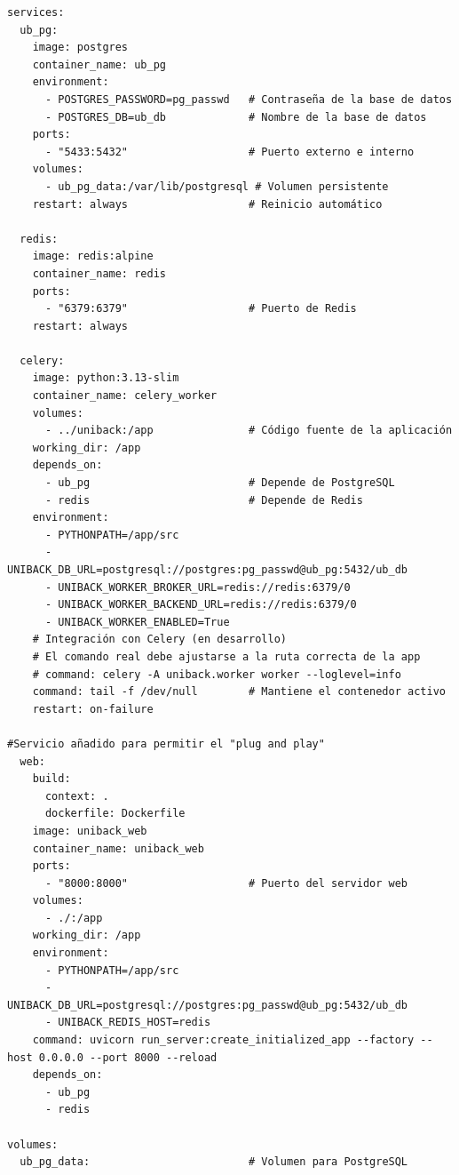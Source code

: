 \begin{lstlisting}[style=dockeryaml, caption={Docker Compose de la aplicación UniBack}, label={lst:dockercompose}]
services:
  ub_pg:
    image: postgres
    container_name: ub_pg
    environment:
      - POSTGRES_PASSWORD=pg_passwd   # Contraseña de la base de datos
      - POSTGRES_DB=ub_db             # Nombre de la base de datos
    ports:
      - "5433:5432"                   # Puerto externo e interno
    volumes:
      - ub_pg_data:/var/lib/postgresql # Volumen persistente
    restart: always                   # Reinicio automático

  redis:
    image: redis:alpine
    container_name: redis
    ports:
      - "6379:6379"                   # Puerto de Redis
    restart: always

  celery:
    image: python:3.13-slim
    container_name: celery_worker
    volumes:
      - ../uniback:/app               # Código fuente de la aplicación
    working_dir: /app
    depends_on:
      - ub_pg                         # Depende de PostgreSQL
      - redis                         # Depende de Redis
    environment:
      - PYTHONPATH=/app/src
      - UNIBACK_DB_URL=postgresql://postgres:pg_passwd@ub_pg:5432/ub_db
      - UNIBACK_WORKER_BROKER_URL=redis://redis:6379/0
      - UNIBACK_WORKER_BACKEND_URL=redis://redis:6379/0
      - UNIBACK_WORKER_ENABLED=True
    # Integración con Celery (en desarrollo)
    # El comando real debe ajustarse a la ruta correcta de la app
    # command: celery -A uniback.worker worker --loglevel=info
    command: tail -f /dev/null        # Mantiene el contenedor activo
    restart: on-failure

#Servicio añadido para permitir el "plug and play"
  web:
    build:
      context: .
      dockerfile: Dockerfile
    image: uniback_web
    container_name: uniback_web
    ports:
      - "8000:8000"                   # Puerto del servidor web
    volumes:
      - ./:/app
    working_dir: /app
    environment:
      - PYTHONPATH=/app/src
      - UNIBACK_DB_URL=postgresql://postgres:pg_passwd@ub_pg:5432/ub_db
      - UNIBACK_REDIS_HOST=redis
    command: uvicorn run_server:create_initialized_app --factory --host 0.0.0.0 --port 8000 --reload
    depends_on:
      - ub_pg
      - redis

volumes:
  ub_pg_data:                         # Volumen para PostgreSQL
\end{lstlisting}

